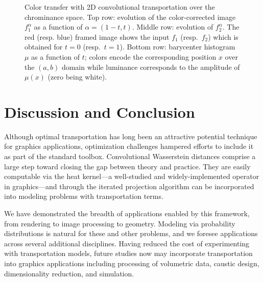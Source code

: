 
\begin{figure}[t]\centering
\vspace{-2mm}
\caption{
Color transfer with 2D convolutional transportation over the chrominance space.
Top row: evolution of the color-corrected image $f_1^\alpha$ as a function of $\alpha=(1-t,t)$.
Middle row: evolution of $f_2^\alpha$.
The red (resp. blue) framed image shows the input $f_1$ (resp.\ $f_2$) which is obtained for $t=0$ (resp.\ $t=1$).
Bottom row: barycenter histogram $\mu$ as a function of $t$; colors encode the corresponding position $x$ over the $(a,b)$ domain while luminance corresponds to the amplitude of $\mu(x)$ (zero being white).
}
\label{fig:ColorTransfer}
\vspace{-2mm}
\end{figure}

\section{Discussion and Conclusion}
Although optimal transportation has long been an attractive potential technique for graphics applications, optimization challenges hampered efforts to include it as part of the standard toolbox.  Convolutional Wasserstein distances comprise a large step toward closing the gap between theory and practice.  They are easily computable via the heat kernel---a well-studied and widely-implemented operator in graphics---and through the iterated projection algorithm can be incorporated into modeling problems with transportation terms.

We have demonstrated the breadth of applications enabled by this framework, from rendering to image processing to geometry.  Modeling via probability distributions is natural for these and other problems, and we foresee applications across several additional disciplines.  Having reduced the cost of experimenting with transportation models, future studies now may incorporate transportation into graphics applications including processing of volumetric data, caustic design, dimensionality reduction, and simulation.


